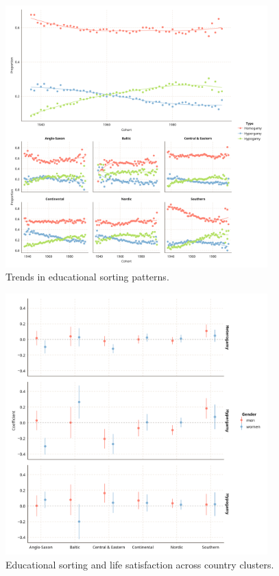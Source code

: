\begin{figure}[H]
    \centering
    \includegraphics[width=0.9\textwidth]{chapters/chapter3/figures/trends.png}
    \caption{Trends in educational sorting patterns.}
    \label{fig:trends_edu_sorting}
\end{figure}

\begin{figure}[H]
    \centering
    \includegraphics[width=0.9\textwidth]{chapters/chapter3/figures/dmm_region.png}
    \caption{Educational sorting and life satisfaction across country clusters.}
    \label{fig:dmm_region}
\end{figure}
